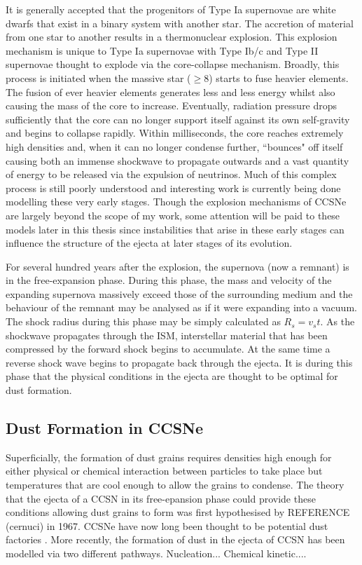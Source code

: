 It is generally accepted that the progenitors of Type Ia supernovae are white dwarfs that exist in a binary system with another star.  The accretion of material from one star to another results in a thermonuclear explosion.  This explosion mechanism is unique to Type Ia supernovae with Type Ib/c and Type II supernovae thought to explode via the core-collapse mechanism.  Broadly, this process is initiated when the massive star ($\ge 8$\msun) starts to fuse heavier elements. The fusion of ever heavier elements generates less and less energy whilst also causing the mass of the core to increase.  Eventually, radiation pressure drops sufficiently that the core can no longer support itself against its own self-gravity and begins to collapse rapidly. Within milliseconds, the core reaches extremely high densities and, when it can no longer condense further, ``bounces" off itself causing both an immense shockwave to propagate outwards and a vast quantity of energy to be released via the expulsion of neutrinos.  Much of this complex process is still poorly understood and interesting work is currently being done modelling these very early stages.  Though the explosion mechanisms of CCSNe are largely beyond the scope of my work, some attention will be paid to these models later in this thesis since instabilities that arise in these early stages can influence the structure of the ejecta at later stages of its evolution.

For several hundred years after the explosion, the supernova (now a remnant) is in the free-expansion phase. During this phase, the mass and velocity of the expanding supernova massively exceed those of the surrounding medium and the behaviour of the remnant may be analysed as if it were expanding into a vacuum.  The shock radius during this phase may be simply calculated as $R_s = v_s t$.  As the shockwave propagates through the ISM, interstellar material that has been compressed by the forward shock begins to accumulate.  At the same time a reverse shock wave begins to propagate back through the ejecta.  It is during this phase that the physical conditions in the ejecta are thought to be optimal for dust formation.


\subsection{Dust Formation in CCSNe}

Superficially, the formation of dust grains requires densities high enough for either physical or chemical interaction between particles to take place but temperatures that are cool enough to allow the grains to condense.  The theory that the ejecta of a CCSN in its free-epansion phase could provide these conditions allowing dust grains to form was first hypothesised by REFERENCE (cernuci) in 1967.  CCSNe have now long been thought to be potential dust factories \citep{Hoyle1970, Kozasa1991, Todini2001}.  More recently, the formation of dust in the ejecta of CCSN has been modelled via two different pathways.
Nucleation...
Chemical kinetic....


